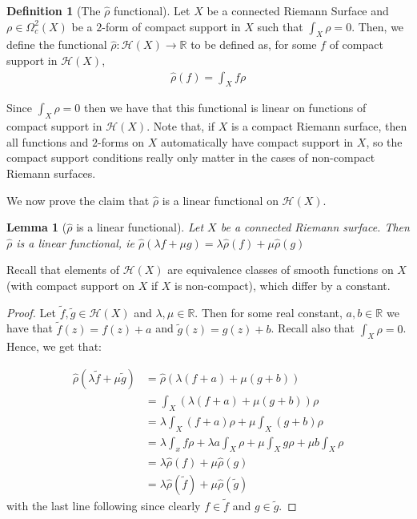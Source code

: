 \documentclass[11pt]{report}
\newtheorem{lemma}[thm]{Lemma}
\theoremstyle{definition}
\newtheorem{defn}[thm]{Definition}
\begin{document}
\begin{defn}[The $\hat{\rho}$ functional]
  Let $X$ be a connected Riemann Surface and $\rho \in \Omega^2_c(X)$ be a $2$-form of compact support in $X$ such that $\int_X \rho = 0$. Then, we define the functional $\hat{\rho} \colon \mathcal{H}(X) \rightarrow \mathbb{R}$ to be defined as, for some $f$ of compact support in $\mathcal{H}(X)$,
  \begin{align*}
    \hat{\rho}(f) = \int_X f\rho
  \end{align*}
\end{defn}

Since $\int_X \rho = 0$ then we have that this functional is linear on functions of compact support in $\mathcal{H}(X)$. Note that, if $X$ is a compact Riemann surface, then all functions and $2$-forms on $X$ automatically have compact support in $X$, so the compact support conditions really only matter in the cases of non-compact Riemann surfaces.


We now prove the claim that $\hat{\rho}$ is a linear functional on $\mathcal{H}(X)$.
\begin{lemma}[$\hat{\rho}$ is a linear functional]\label{rhohatlinear}
  Let $X$ be a connected Riemann surface. Then $\hat{\rho}$ is a linear functional, ie $\hat{\rho}(\lambda f+ \mu g) = \lambda \hat{\rho}(f) + \mu \hat{\rho}(g)$
\end{lemma}
Recall that elements of $\mathcal{H}(X)$ are equivalence classes of smooth functions on $X$ (with compact support on $X$ if $X$ is non-compact), which differ by a constant.
\begin{proof}
  Let $\tilde{f},\tilde{g} \in \mathcal{H}(X)$ and $\lambda,\mu \in \mathbb{R}$. Then for some real constant, $a,b \in \mathbb{R}$ we have that $\tilde{f}(z) = f(z) + a$ and $\tilde{g}(z) = g(z) + b$. Recall also that $\int_X \rho = 0$.
  Hence, we get that:

  \begin{align*}
    \hat{\rho}(\lambda \tilde{f}+ \mu \tilde{g}) &= \hat{\rho}(\lambda(f + a) + \mu(g + b)) \\
    &=\int_X (\lambda(f + a) + \mu(g + b))\rho \\
    &=\lambda \int_X (f + a)\rho + \mu \int_X (g + b)\rho \\
    &=\lambda \int_x f\rho + \lambda a\int_X \rho + \mu \int_X g\rho + \mu b\int_X \rho \\
    &=\lambda \hat{\rho}(f) + \mu \hat{\rho}(g)\\
    &=\lambda \hat{\rho}(\tilde{f}) + \mu \hat{\rho}(\tilde{g})
  \end{align*}
  with the last line following since clearly $f \in \tilde{f}$ and $g \in \tilde{g}$.
\end{proof}
\end{document}
